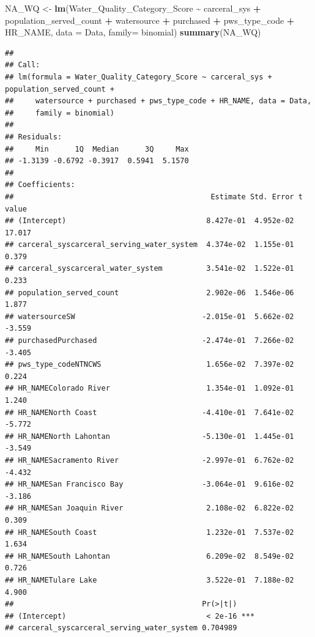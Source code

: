 \documentclass[
]{article}
\newenvironment{Shaded}{\begin{snugshade}}{\end{snugshade}}
\newcommand{\AttributeTok}[1]{\textcolor[rgb]{0.13,0.29,0.53}{#1}}
\newcommand{\FunctionTok}[1]{\textcolor[rgb]{0.13,0.29,0.53}{\textbf{#1}}}
\newcommand{\NormalTok}[1]{#1}
\newcommand{\OtherTok}[1]{\textcolor[rgb]{0.56,0.35,0.01}{#1}}
\newcommand{\SpecialCharTok}[1]{\textcolor[rgb]{0.81,0.36,0.00}{\textbf{#1}}}
\begin{document}
\begin{Shaded}
\begin{Highlighting}[]
\NormalTok{NA\_WQ }\OtherTok{\textless{}{-}} \FunctionTok{lm}\NormalTok{(Water\_Quality\_Category\_Score }\SpecialCharTok{\textasciitilde{}}\NormalTok{ carceral\_sys }\SpecialCharTok{+}\NormalTok{ population\_served\_count }\SpecialCharTok{+}\NormalTok{ watersource }\SpecialCharTok{+}\NormalTok{ purchased }\SpecialCharTok{+}\NormalTok{ pws\_type\_code }\SpecialCharTok{+}\NormalTok{ HR\_NAME, }\AttributeTok{data =}\NormalTok{ Data, }\AttributeTok{family=}\NormalTok{ binomial)}
\FunctionTok{summary}\NormalTok{(NA\_WQ)}
\end{Highlighting}
\end{Shaded}

\begin{verbatim}
## 
## Call:
## lm(formula = Water_Quality_Category_Score ~ carceral_sys + population_served_count + 
##     watersource + purchased + pws_type_code + HR_NAME, data = Data, 
##     family = binomial)
## 
## Residuals:
##     Min      1Q  Median      3Q     Max 
## -1.3139 -0.6792 -0.3917  0.5941  5.1570 
## 
## Coefficients:
##                                             Estimate Std. Error t value
## (Intercept)                                8.427e-01  4.952e-02  17.017
## carceral_syscarceral_serving_water_system  4.374e-02  1.155e-01   0.379
## carceral_syscarceral_water_system          3.541e-02  1.522e-01   0.233
## population_served_count                    2.902e-06  1.546e-06   1.877
## watersourceSW                             -2.015e-01  5.662e-02  -3.559
## purchasedPurchased                        -2.474e-01  7.266e-02  -3.405
## pws_type_codeNTNCWS                        1.656e-02  7.397e-02   0.224
## HR_NAMEColorado River                      1.354e-01  1.092e-01   1.240
## HR_NAMENorth Coast                        -4.410e-01  7.641e-02  -5.772
## HR_NAMENorth Lahontan                     -5.130e-01  1.445e-01  -3.549
## HR_NAMESacramento River                   -2.997e-01  6.762e-02  -4.432
## HR_NAMESan Francisco Bay                  -3.064e-01  9.616e-02  -3.186
## HR_NAMESan Joaquin River                   2.108e-02  6.822e-02   0.309
## HR_NAMESouth Coast                         1.232e-01  7.537e-02   1.634
## HR_NAMESouth Lahontan                      6.209e-02  8.549e-02   0.726
## HR_NAMETulare Lake                         3.522e-01  7.188e-02   4.900
##                                           Pr(>|t|)    
## (Intercept)                                < 2e-16 ***
## carceral_syscarceral_serving_water_system 0.704989    

\end{verbatim}
\end{document}
